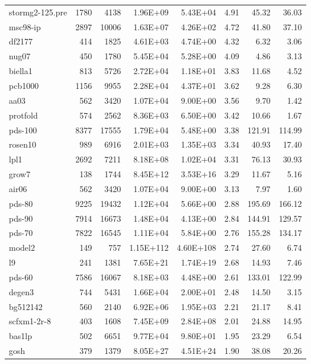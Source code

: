 \documentclass[10pt]{article}
\begin{document}
\begin{longtable}{|l|r|r|r|r|r|r|r|}
stormg2-125.pre	&	1780	&	4138	&	1.96E+09	&	5.43E+04	&	4.91	&	45.32	&	36.03	\\
msc98-ip	&	2897	&	10006	&	1.63E+07	&	4.26E+02	&	4.72	&	41.80	&	37.10	\\
df2177	&	414	&	1825	&	4.61E+03	&	4.74E+00	&	4.32	&	6.32	&	3.06	\\
nug07	&	450	&	1780	&	5.45E+04	&	5.28E+00	&	4.09	&	4.86	&	3.13	\\
biella1	&	813	&	5726	&	2.72E+04	&	1.18E+01	&	3.83	&	11.68	&	4.52	\\
pcb1000	&	1156	&	9955	&	2.28E+04	&	4.37E+01	&	3.62	&	9.28	&	6.30	\\
aa03	&	562	&	3420	&	1.07E+04	&	9.00E+00	&	3.56	&	9.70	&	1.42	\\
protfold	&	574	&	2562	&	8.36E+03	&	6.50E+00	&	3.42	&	10.66	&	1.67	\\
pds-100	&	8377	&	17555	&	1.79E+04	&	5.48E+00	&	3.38	&	121.91	&	114.99	\\
rosen10	&	989	&	6916	&	2.01E+03	&	1.35E+03	&	3.34	&	40.93	&	17.40	\\
lpl1	&	2692	&	7211	&	8.18E+08	&	1.02E+04	&	3.31	&	76.13	&	30.93	\\
grow7	&	138	&	1744	&	8.45E+12	&	3.53E+16	&	3.29	&	11.67	&	5.16	\\
air06	&	562	&	3420	&	1.07E+04	&	9.00E+00	&	3.13	&	7.97	&	1.60	\\
pds-80	&	9225	&	19432	&	1.12E+04	&	5.66E+00	&	2.88	&	195.69	&	166.12	\\
pds-90	&	7914	&	16673	&	1.48E+04	&	4.13E+00	&	2.84	&	144.91	&	129.57	\\
pds-70	&	7822	&	16545	&	1.11E+04	&	5.84E+00	&	2.76	&	155.28	&	134.17	\\
model2	&	149	&	757	&	1.15E+112	&	4.60E+108	&	2.74	&	27.60	&	6.74	\\
l9	&	241	&	1381	&	7.65E+21	&	1.74E+19	&	2.68	&	14.93	&	7.46	\\
pds-60	&	7586	&	16067	&	8.18E+03	&	4.48E+00	&	2.61	&	133.01	&	122.99	\\
degen3	&	744	&	5431	&	1.66E+04	&	2.00E+01	&	2.48	&	14.50	&	3.15	\\
bg512142	&	560	&	2140	&	6.92E+06	&	1.95E+03	&	2.21	&	21.17	&	8.41	\\
scfxm1-2r-8	&	403	&	1608	&	7.45E+09	&	2.84E+08	&	2.01	&	24.88	&	14.95	\\
bas1lp	&	502	&	6651	&	9.77E+04	&	9.80E+01	&	1.95	&	23.29	&	6.54	\\
gosh	&	379	&	1379	&	8.05E+27	&	4.51E+24	&	1.90	&	38.08	&	20.26	\\

\end{longtable}
\end{document}
